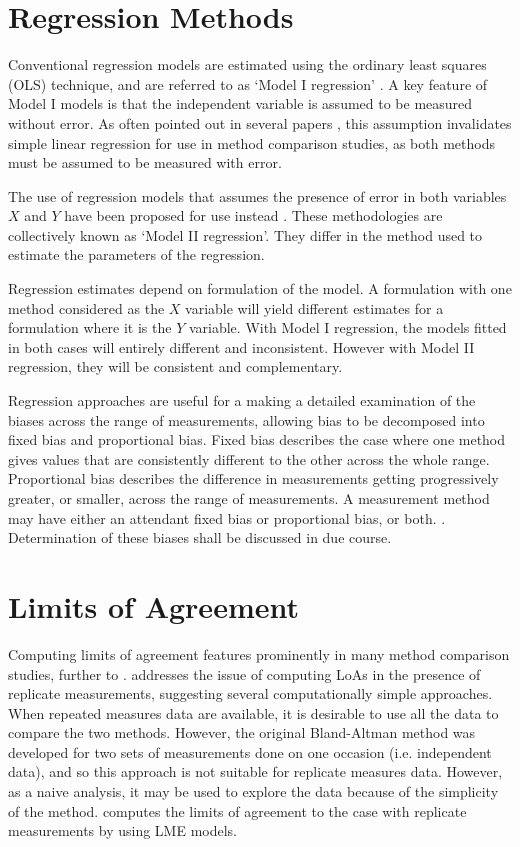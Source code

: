 \documentclass[Chap2main.tex]{subfiles}
\begin{document}
\section{Regression Methods}
Conventional regression models are estimated using the ordinary
least squares (OLS) technique, and are referred to as `Model I
regression' \citep{CornCoch,ludbrook97}. A key feature of Model I
models is that the independent variable is assumed to be measured
without error. As often pointed out in several papers
\citep{BA83,ludbrook97}, this assumption invalidates simple linear
regression for use in method comparison studies, as both methods
must be assumed to be measured with error.

The use of regression models that assumes the presence of error in
both variables $X$ and $Y$ have been proposed for use instead
\citep{CornCoch,ludbrook97}. These methodologies are collectively
known as `Model II regression'. They differ in the method used to
estimate the parameters of the regression.

Regression estimates depend on formulation of the model. A
formulation with one method considered as the $X$ variable will
yield different estimates for a formulation where it is the $Y$
variable. With Model I regression, the models fitted in both cases
will entirely different and inconsistent. However with Model II
regression, they will be consistent and complementary.

Regression approaches are useful for a making a detailed examination of the biases across the range of measurements, allowing bias to be decomposed into fixed bias and proportional bias.
Fixed bias describes the case where one method gives values that are consistently different
to the other across the whole range. Proportional
bias describes the difference in measurements getting progressively greater, or smaller, across the range of measurements. A measurement method may have either an attendant fixed bias or proportional bias, or both. \citep{ludbrook}. Determination of these biases shall be discussed in due course.

\section{Limits of Agreement}

Computing limits of agreement features prominently in many method comparison studies, further to \citet{BA86,BA99}.
\citet{BA99} addresses the issue of computing LoAs in the presence of replicate measurements, suggesting several computationally simple approaches. When repeated measures data are available, it is desirable to use
all the data to compare the two methods. However, the original Bland-Altman method was developed for two sets of measurements done on one occasion (i.e. independent data), and so this approach is not suitable for replicate measures data. However, as a naive analysis, it may be used to explore the data because of the simplicity of the method.
\citet{bxc2008}  computes the limits of agreement to the case with replicate measurements by using LME models.
\end{document}
